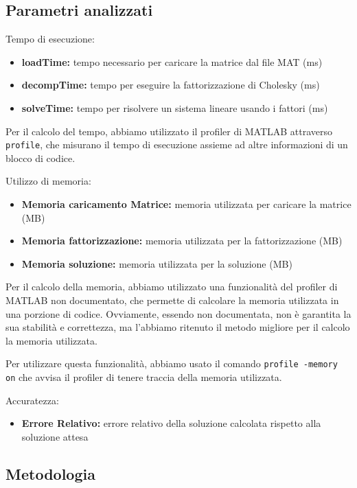 \subsection{Parametri analizzati}

Tempo di esecuzione:
\begin{itemize}
    \item \textbf{loadTime:} tempo necessario per caricare la matrice dal file MAT (ms)
    \item \textbf{decompTime:} tempo per eseguire la fattorizzazione di Cholesky (ms)
    \item \textbf{solveTime:} tempo per risolvere un sistema lineare usando i fattori (ms)
\end{itemize}

Per il calcolo del tempo, abbiamo utilizzato il profiler di MATLAB attraverso \texttt{profile},
che misurano il tempo di esecuzione assieme ad altre informazioni di un blocco di codice.

Utilizzo di memoria:
\begin{itemize}
    \item \textbf{Memoria caricamento Matrice:} memoria utilizzata per caricare la matrice (MB)
    \item \textbf{Memoria fattorizzazione:} memoria utilizzata per la fattorizzazione (MB)
    \item \textbf{Memoria soluzione:} memoria utilizzata per la soluzione (MB)
\end{itemize}

Per il calcolo della memoria, abbiamo utilizzato una funzionalità del profiler di MATLAB non documentato,
che permette di calcolare la memoria utilizzata in una porzione di codice. Ovviamente, essendo non documentata, non
è garantita la sua stabilità e correttezza, ma l'abbiamo ritenuto il metodo migliore per il calcolo la memoria
utilizzata.

Per utilizzare questa funzionalità, abbiamo usato il comando \texttt{profile -memory on} che avvisa il profiler di tenere traccia
della memoria utilizzata.

Accuratezza:
\begin{itemize}
    \item \textbf{Errore Relativo:} errore relativo della soluzione calcolata rispetto alla soluzione attesa
\end{itemize}

\subsection{Metodologia}

